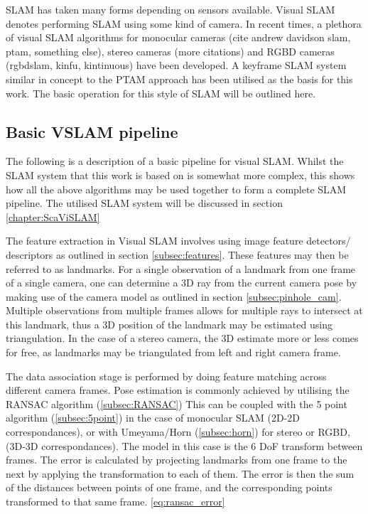 SLAM has taken many forms depending on sensors available. Visual SLAM denotes performing SLAM using
some kind of camera.  In recent times, a plethora of visual SLAM algorithms for monocular cameras
(cite andrew davidson slam, ptam, something else), stereo cameras (more citations) and RGBD cameras
(rgbdslam, kinfu, kintinuous) have been developed.  A keyframe SLAM system similar in concept to the
PTAM approach has been utilised as the basis for this work.  The basic operation for this style of
SLAM will be outlined here.

\subsection{Basic VSLAM pipeline}

The following is a description of a basic pipeline for visual SLAM.  Whilst the SLAM system that
this work is based on is somewhat more complex, this shows how all the above algorithms may be used
together to form a complete SLAM pipeline.  The utilised SLAM system will be discussed in section
\ref{chapter:ScaViSLAM}

The feature extraction in Visual SLAM involves using image feature detectors/ descriptors as
outlined in section \ref{subsec:features}.  These features may then be referred to as
landmarks. For a single observation of a landmark from one frame of a single camera, one can
determine a 3D ray from the current camera pose by making use of the camera model as outlined in
section \ref{subsec:pinhole_cam}.  Multiple observations from multiple frames allows for multiple
rays to intersect at this landmark, thus a 3D position of the landmark may be estimated using
triangulation. In the case of a stereo camera, the 3D estimate more or less comes for free, as
landmarks may be triangulated from left and right camera frame.

The data association stage is performed by doing feature matching across different camera frames.
Pose estimation is commonly achieved by utilising the RANSAC algorithm (\ref{subsec:RANSAC}) 
This can be coupled with the 5 point algorithm (\ref{subsec:5point}) in the case of monocular SLAM
(2D-2D correspondances), or with Umeyama/Horn (\ref{subsec:horn}) for stereo or RGBD, (3D-3D
correspondances). The model in this case is the 6 DoF transform between frames. The error is
calculated by projecting landmarks from one frame to the next by applying the transformation to each
of them. The error is then the sum of the distances between points of one frame, and the
corresponding points transformed to that same frame. \ref{eq:ransac_error}

